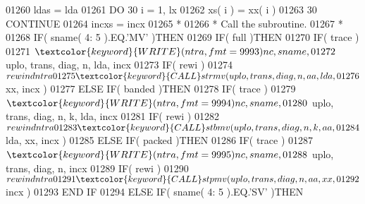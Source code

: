 \begin{DoxyCode}
01260                         ldas = lda
01261                         \textcolor{keywordflow}{DO} 30 i = 1, lx
01262                            xs( i ) = xx( i )
01263    30                   \textcolor{keywordflow}{CONTINUE}
01264                         incxs = incx
01265 \textcolor{comment}{*}
01266 \textcolor{comment}{*                       Call the subroutine.}
01267 \textcolor{comment}{*}
01268                         \textcolor{keywordflow}{IF}( sname( 4: 5 ).EQ.\textcolor{stringliteral}{'MV'} )\textcolor{keywordflow}{THEN}
01269                            \textcolor{keywordflow}{IF}( full )\textcolor{keywordflow}{THEN}
01270                               \textcolor{keywordflow}{IF}( trace )
01271      $                           \textcolor{keyword}{WRITE}( ntra, fmt = 9993 )nc, sname,
01272      $                           uplo, trans, diag, n, lda, incx
01273                               \textcolor{keywordflow}{IF}( rewi )
01274      $                           rewind ntra
01275                               \textcolor{keyword}{CALL }strmv( uplo, trans, diag, n, aa, lda,
01276      $                                    xx, incx )
01277                            \textcolor{keywordflow}{ELSE} \textcolor{keywordflow}{IF}( banded )\textcolor{keywordflow}{THEN}
01278                               \textcolor{keywordflow}{IF}( trace )
01279      $                           \textcolor{keyword}{WRITE}( ntra, fmt = 9994 )nc, sname,
01280      $                           uplo, trans, diag, n, k, lda, incx
01281                               \textcolor{keywordflow}{IF}( rewi )
01282      $                           rewind ntra
01283                               \textcolor{keyword}{CALL }stbmv( uplo, trans, diag, n, k, aa,
01284      $                                    lda, xx, incx )
01285                            \textcolor{keywordflow}{ELSE} \textcolor{keywordflow}{IF}( packed )\textcolor{keywordflow}{THEN}
01286                               \textcolor{keywordflow}{IF}( trace )
01287      $                           \textcolor{keyword}{WRITE}( ntra, fmt = 9995 )nc, sname,
01288      $                           uplo, trans, diag, n, incx
01289                               \textcolor{keywordflow}{IF}( rewi )
01290      $                           rewind ntra
01291                               \textcolor{keyword}{CALL }stpmv( uplo, trans, diag, n, aa, xx,
01292      $                                    incx )
01293 \textcolor{keywordflow}{                           END IF}
01294                         \textcolor{keywordflow}{ELSE} \textcolor{keywordflow}{IF}( sname( 4: 5 ).EQ.\textcolor{stringliteral}{'SV'} )\textcolor{keywordflow}{THEN}

\end{DoxyCode}
